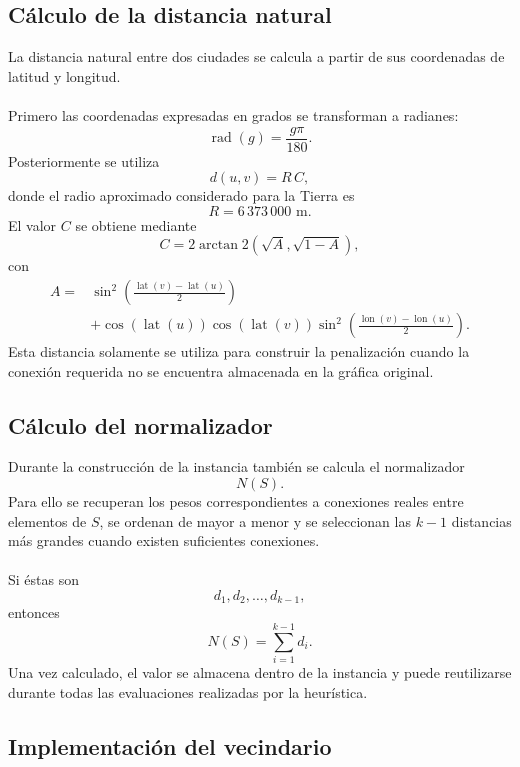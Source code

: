 \documentclass[12pt]{article}
\begin{document}
\subsection{Cálculo de la distancia natural}

La distancia natural entre dos ciudades se calcula a partir de sus
coordenadas de latitud y longitud.
\\\\
Primero las coordenadas expresadas en grados se transforman a radianes:
\[
    \operatorname{rad}(g)
    =
    \frac{g\pi}{180}.
\]
Posteriormente se utiliza
\[
    d(u,v)=R\,C,
\]
donde el radio aproximado considerado para la Tierra es
\[
    R=6\,373\,000\text{ m}.
\]
El valor \(C\) se obtiene mediante
\[
    C=
    2\arctan2
    \left(
        \sqrt{A},
        \sqrt{1-A}
    \right),
\]
con
\[
\begin{split}
A={}&
\sin^{2}
\left(
    \frac{
        \operatorname{lat}(v)
        -
        \operatorname{lat}(u)
    }{2}
\right)
\\
&+
\cos
\left(
    \operatorname{lat}(u)
\right)
\cos
\left(
    \operatorname{lat}(v)
\right)
\sin^{2}
\left(
    \frac{
        \operatorname{lon}(v)
        -
        \operatorname{lon}(u)
    }{2}
\right).
\end{split}
\]
Esta distancia solamente se utiliza para construir la penalización cuando
la conexión requerida no se encuentra almacenada en la gráfica original.

\subsection{Cálculo del normalizador}

Durante la construcción de la instancia también se calcula el normalizador
\[
    N(S).
\]
Para ello se recuperan los pesos correspondientes a conexiones reales entre
elementos de \(S\), se ordenan de mayor a menor y se seleccionan las
\(k-1\) distancias más grandes cuando existen suficientes conexiones.
\\\\
Si éstas son
\[
    d_1,d_2,\ldots,d_{k-1},
\]
entonces
\[
    N(S)
    =
    \sum_{i=1}^{k-1}d_i.
\]
Una vez calculado, el valor se almacena dentro de la instancia y puede
reutilizarse durante todas las evaluaciones realizadas por la heurística.

\subsection{Implementación del vecindario}
\end{document}

